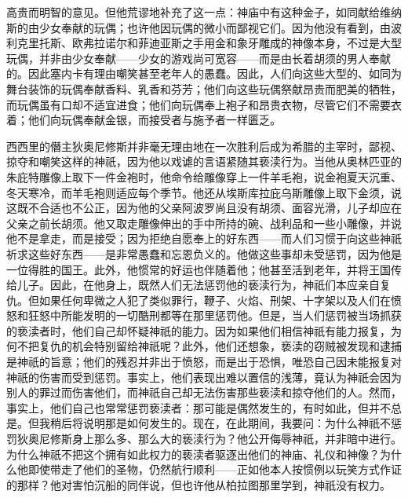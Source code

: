 \par

高贵而明智的意见。但他荒谬地补充了这一点：神庙中有这种金子，如同献给维纳斯的由少女奉献的玩偶；也许他因玩偶的微小而鄙视它们。因为他没有看到，由波利克里托斯、欧弗拉诺尔和菲迪亚斯之手用金和象牙雕成的神像本身，不过是大型玩偶，并非由少女奉献——少女的游戏尚可宽容——而是由长着胡须的男人奉献的。因此塞内卡有理由嘲笑甚至老年人的愚蠢。因此，人们向这些大型的、如同为舞台装饰的玩偶奉献香料、乳香和芬芳；他们向这些玩偶祭献昂贵而肥美的牺牲，而玩偶虽有口却不适宜进食；他们向玩偶奉上袍子和昂贵衣物，尽管它们不需要衣着；他们向玩偶奉献金银，而接受者与施予者一样匮乏。\par

西西里的僭主狄奥尼修斯并非毫无理由地在一次胜利后成为希腊的主宰时，鄙视、掠夺和嘲笑这样的神祇，因为他以戏谑的言语紧随其亵渎行为。当他从奥林匹亚的朱庇特雕像上取下一件金袍时，他命令给雕像穿上一件羊毛袍，说金袍夏天沉重、冬天寒冷，而羊毛袍则适应每个季节。他还从埃斯库拉庇乌斯雕像上取下金须，说这既不合适也不公正，因为他的父亲阿波罗尚且没有胡须、面容光滑，儿子却应在父亲之前长胡须。他又取走雕像伸出的手中所持的碗、战利品和一些小雕像，并说他不是拿走，而是接受；因为拒绝自愿奉上的好东西——而人们习惯于向这些神祇祈求这些好东西——是非常愚蠢和忘恩负义的。他做这些事却未受惩罚，因为他是一位得胜的国王。此外，他惯常的好运也伴随着他；他甚至活到老年，并将王国传给儿子。因此，在他身上，既然人们无法惩罚他的亵渎行为，神祇们本应亲自复仇。但如果任何卑微之人犯了类似罪行，鞭子、火焰、刑架、十字架以及人们在愤怒和狂怒中所能发明的一切酷刑都等在那里惩罚他。但是，当人们惩罚被当场抓获的亵渎者时，他们自己却怀疑神祇的能力。因为如果他们相信神祇有能力报复，为何不把复仇的机会特别留给神祇呢？此外，他们还想象，亵渎的窃贼被发现和逮捕是神祇的旨意；他们的残忍并非出于愤怒，而是出于恐惧，唯恐自己因未能报复对神祇的伤害而受到惩罚。事实上，他们表现出难以置信的浅薄，竟认为神祇会因为别人的罪过而伤害他们，而神祇自己却无法伤害那些亵渎和掠夺他们的人。然而，事实上，他们自己也常常惩罚亵渎者：那可能是偶然发生的，有时如此，但并不总是。但我稍后将说明那是如何发生的。现在，在此期间，我要问：为什么神祇不惩罚狄奥尼修斯身上那么多、那么大的亵渎行为？他公开侮辱神祇，并非暗中进行。为什么神祇不把这个拥有如此权力的亵渎者驱逐出他们的神庙、礼仪和神像？为什么他即使带走了他们的圣物，仍然航行顺利——正如他本人按惯例以玩笑方式作证的那样？他对害怕沉船的同伴说，但也许他从柏拉图那里学到，神祇没有权力。\par

